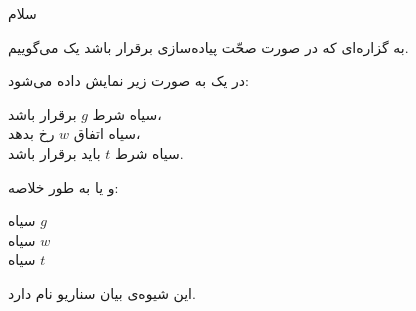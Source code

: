 

سلام

 به گزاره‌ای که در صورت صحّت پیاده‌سازی برقرار باشد یک
 می‌گوییم.   

در  یک  به صورت زیر نمایش
داده می‌شود:

{
‌سیاه{} شرط $g$ برقرار باشد، \\
‌سیاه{} اتفاق $w$ رخ بدهد، \\
‌سیاه{} شرط $t$ باید برقرار باشد.
}

و یا به طور خلاصه:

{
‌سیاه{} $g$ \\
‌سیاه{} $w$ \\
‌سیاه{} $t$
}

این شیوه‌ی بیان سناریو  نام دارد.


